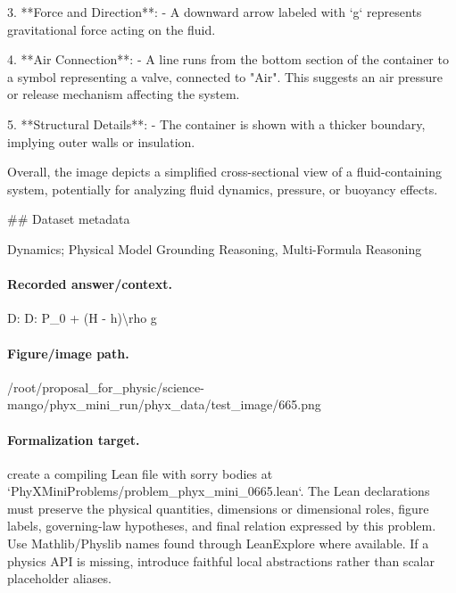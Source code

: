 3. **Force and Direction**:
   - A downward arrow labeled with `g` represents gravitational force acting on the fluid.

4. **Air Connection**:
   - A line runs from the bottom section of the container to a symbol representing a valve, connected to "Air". This suggests an air pressure or release mechanism affecting the system.

5. **Structural Details**:
   - The container is shown with a thicker boundary, implying outer walls or insulation.

Overall, the image depicts a simplified cross-sectional view of a fluid-containing system, potentially for analyzing fluid dynamics, pressure, or buoyancy effects.

\#\# Dataset metadata

Dynamics; Physical Model Grounding Reasoning, Multi-Formula Reasoning

\paragraph{Recorded answer/context.}
D: D: P\_0 + (H - h)\textbackslash{}rho g

\paragraph{Figure/image path.}
/root/proposal\_for\_physic/science-mango/phyx\_mini\_run/phyx\_data/test\_image/665.png

\paragraph{Formalization target.}
create a compiling Lean file with sorry bodies at `PhyXMiniProblems/problem\_phyx\_mini\_0665.lean`. The Lean declarations must preserve the physical quantities, dimensions or dimensional roles, figure labels, governing-law hypotheses, and final relation expressed by this problem.
Use Mathlib/Physlib names found through LeanExplore where available. If a physics API is missing, introduce faithful local abstractions rather than scalar placeholder aliases.

